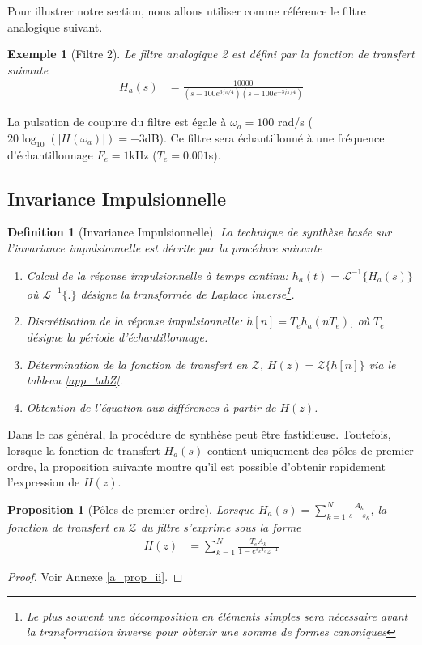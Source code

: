 \documentclass[11pt,a4paper]{IEEEtran}
\newtheorem{proposition}{Proposition}
\newtheorem*{exemple}{Exemple}
\newtheorem{definition}{Definition}
\begin{document}
Pour illustrer notre section, nous allons utiliser comme référence le filtre analogique suivant.

\begin{exemple}[Filtre 2] Le filtre analogique 2 est défini par la fonction de transfert suivante
\begin{align*}
H_a(s)&=\frac{10000}{(s-100e^{3j\pi/4})(s-100e^{-3j\pi/4})}
\end{align*}
\end{exemple}
La pulsation de coupure du filtre est égale à $\omega_a=100$ rad/s ($20\log_{10}(|H(\omega_a)|)=-3$dB). Ce filtre sera échantillonné à une fréquence d'échantillonnage $F_e=1$kHz ($T_e=0.001$s).

\subsection{Invariance Impulsionnelle}

\begin{definition}[Invariance Impulsionnelle] La technique de synthèse basée sur l'invariance impulsionnelle est décrite par la procédure suivante
\begin{enumerate}
\item Calcul de la réponse impulsionnelle à temps continu: $h_a(t)=\mathcal{L}^{-1}\{H_a(s)\}$ où $\mathcal{L}^{-1}\{.\}$ désigne la transformée de Laplace inverse\footnote{Le plus souvent une décomposition en éléments simples sera nécessaire avant la transformation inverse pour obtenir une somme de formes canoniques}.
\item Discrétisation de la réponse impulsionnelle: $h[n]=T_e h_a(n T_e)$,  où $T_e$ désigne la période d'échantillonnage.
\item Détermination de la fonction de transfert en $\mathcal{Z}$, $H(z)=\mathcal{Z}\{h[n]\}$ via le tableau \ref{app_tabZ}.
\item Obtention de l'équation aux différences à partir de $H(z)$.
\end{enumerate}
\end{definition}

Dans le cas général, la procédure de synthèse peut être fastidieuse. Toutefois, lorsque la fonction de transfert $H_a(s)$ contient uniquement des pôles de premier ordre, la proposition suivante montre qu'il est possible d'obtenir rapidement l'expression de $H(z)$.
\begin{proposition}[Pôles de premier ordre]
\label{prop_ii}
Lorsque $H_a(s)=\sum_{k=1}^{N} \frac{A_k}{s-s_k}$, la fonction de transfert en $\mathcal{Z}$ du filtre s'exprime sous la forme
\begin{align}
H(z)&=\sum_{k=1}^{N} \frac{T_e A_k}{1-e^{s_kT_e}z^{-1}}
\end{align}
\end{proposition}
\begin{proof}
Voir Annexe \ref{a_prop_ii}.
\end{proof}
\end{document}
